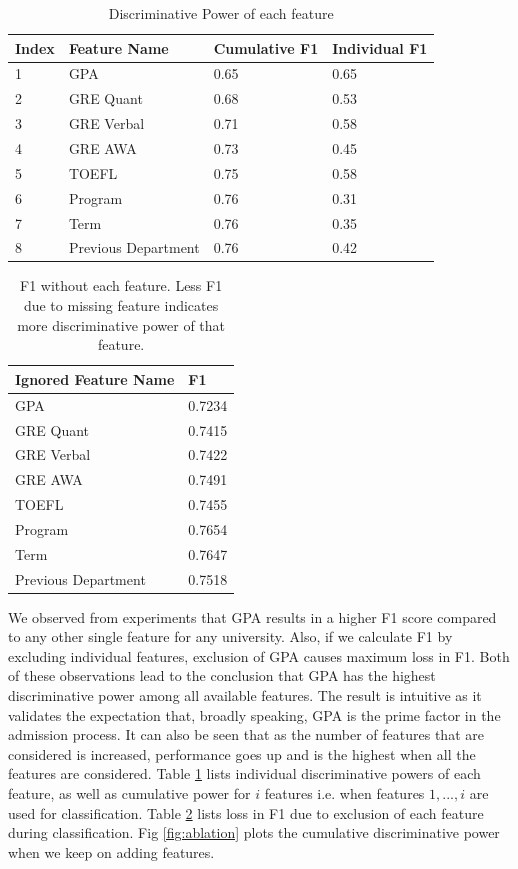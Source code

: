 \documentclass{sig-alternate-05-2015}
\begin{document}
\begin{table}[h]
\centering
\caption{Discriminative Power of each feature}
\label{tab:ablation}
\begin{tabular}{p{0.5 cm} p{2.5 cm} p{1.3 cm} p{1.3 cm}}\\
Index & Feature Name & Cumulative F1 & Individual F1 \\ \hline
1 & GPA & 0.65 & 0.65 \\ \hline
2 & GRE Quant & 0.68 & 0.53 \\ \hline
3 & GRE Verbal & 0.71 & 0.58 \\ \hline
4 & GRE AWA & 0.73 & 0.45 \\ \hline
5 & TOEFL & 0.75 & 0.58 \\ \hline
6 & Program & 0.76 & 0.31 \\ \hline
7 & Term & 0.76 & 0.35 \\ \hline
8 & Previous Department & 0.76 & 0.42 \\ \hline
\end{tabular}
\end{table}

\begin{table}
\centering
\caption{F1 without each feature. Less F1 due to missing feature indicates more discriminative power of that feature.}
\label{tab:ablation-2}
\begin{tabular}{p{4.0 cm} p{1.3 cm}} \\
Ignored Feature Name & F1 \\ \hline
GPA & 0.7234 \\ \hline
GRE Quant & 0.7415 \\ \hline
GRE Verbal & 0.7422 \\ \hline
GRE AWA & 0.7491 \\ \hline
TOEFL & 0.7455 \\ \hline
Program & 0.7654 \\ \hline
Term & 0.7647 \\ \hline
Previous Department & 0.7518 \\ \hline
\end{tabular}
\end{table}

We observed from experiments that GPA results in a higher F1 score compared to any other single feature for any university. Also, if we calculate F1 by excluding individual features, exclusion of GPA causes maximum loss in F1. Both of these observations lead to the conclusion that GPA has the highest discriminative power among all available features. The result is intuitive as it validates the expectation that, broadly speaking, GPA is the prime factor in the admission process. It can also be seen that as the number of features that are considered is increased, performance goes up and is the highest when all the features are considered. Table \ref{tab:ablation} lists individual discriminative powers of each feature, as well as cumulative power for $i$ features i.e. when features ${1,...,i}$ are used for classification. Table \ref{tab:ablation-2} lists loss in F1 due to exclusion of each feature during classification. Fig \ref{fig:ablation} plots the cumulative discriminative power when we keep on adding features.
\end{document}
